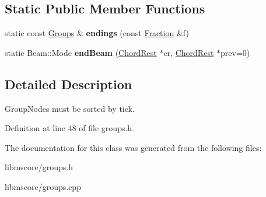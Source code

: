 \subsection*{Static Public Member Functions}
\begin{DoxyCompactItemize}
\item 
\mbox{\label{class_ms_1_1_groups_ac4775af435a15913a954eb560ec2fd8a}} 
static const \hyperlink{class_ms_1_1_groups}{Groups} \& {\bfseries endings} (const \hyperlink{class_ms_1_1_fraction}{Fraction} \&f)
\item 
\mbox{\label{class_ms_1_1_groups_a941048b9a1849553fefa03c781b06c65}} 
static Beam\+::\+Mode {\bfseries end\+Beam} (\hyperlink{class_ms_1_1_chord_rest}{Chord\+Rest} $\ast$cr, \hyperlink{class_ms_1_1_chord_rest}{Chord\+Rest} $\ast$prev=0)
\end{DoxyCompactItemize}


\subsection{Detailed Description}
Group\+Nodes must be sorted by tick. 

Definition at line 48 of file groups.\+h.



The documentation for this class was generated from the following files\+:\begin{DoxyCompactItemize}
\item 
libmscore/groups.\+h\item 
libmscore/groups.\+cpp\end{DoxyCompactItemize}

